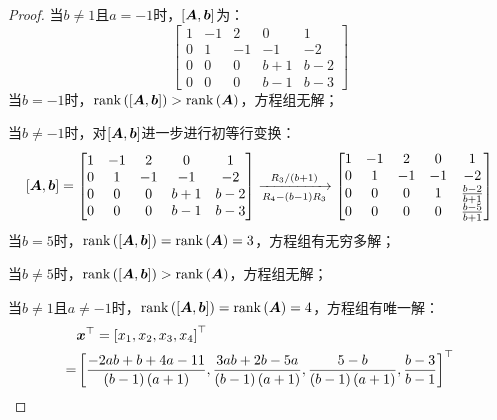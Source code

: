 \begin{proof}
    当\(b\neq1\)且\(a=-1\)时，\(\left[ \boldsymbol{A},\boldsymbol{b} \right]\)为：
    \begin{equation*}
        \begin{bmatrix}
            1 & -1 & 2  & 0   & 1   \\
            0 & 1  & -1 & -1  & -2  \\
            0 & 0  & 0  & b+1 & b-2 \\
            0 & 0  & 0  & b-1 & b-3
        \end{bmatrix}
    \end{equation*}
    当\(b=-1\)时，\(\mathrm{rank}\left( \left[ \boldsymbol{A},\boldsymbol{b} \right] \right)>\mathrm{rank}\left( \boldsymbol{A} \right)\)，方程组无解；

    当\(b\neq-1\)时，对\(\left[ \boldsymbol{A},\boldsymbol{b} \right]\)进一步进行初等行变换：
    \begin{equation*}
        \left[ \boldsymbol{A},\boldsymbol{b} \right]=
        \begin{bmatrix}
            1 & -1 & 2  & 0   & 1   \\
            0 & 1  & -1 & -1  & -2  \\
            0 & 0  & 0  & b+1 & b-2 \\
            0 & 0  & 0  & b-1 & b-3
        \end{bmatrix}\xrightarrow[R_4-\left( b-1 \right)R_3]{R_3/\left( b+1 \right)}
        \begin{bmatrix}
            1 & -1 & 2  & 0  & 1               \\
            0 & 1  & -1 & -1 & -2              \\
            0 & 0  & 0  & 1  & \frac{b-2}{b+1} \\
            0 & 0  & 0  & 0  & \frac{b-5}{b+1}
        \end{bmatrix}
    \end{equation*}
    当\(b=5\)时，\(\mathrm{rank}\left( \left[ \boldsymbol{A},\boldsymbol{b} \right] \right)=\mathrm{rank}\left( \boldsymbol{A} \right)=3\)，方程组有无穷多解；

    当\(b\neq5\)时，\(\mathrm{rank}\left( \left[ \boldsymbol{A},\boldsymbol{b} \right] \right)>\mathrm{rank}\left( \boldsymbol{A} \right)\)，方程组无解；

    当\(b\neq1\)且\(a\neq-1\)时，\(\mathrm{rank}\left( \left[ \boldsymbol{A},\boldsymbol{b} \right] \right)=\mathrm{rank}\left( \boldsymbol{A} \right)=4\)，方程组有唯一解：
    \begin{align*}
          & \boldsymbol{x}^\top=\left[ x_1,x_2,x_3,x_4 \right]^\top                                                                                                        \\
        = & \left[ \frac{-2ab+b+4a-11}{\left( b-1 \right)\left( a+1 \right)},\frac{3ab+2b-5a}{\left( b-1 \right)\left( a+1 \right)},\frac{5-b}{\left( b-1 \right)\left( a+1 \right)},\frac{b-3}{b-1} \right]^\top
    \end{align*}
\end{proof}

